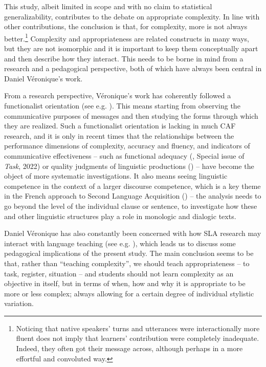 \documentclass[output=paper]{langscibook}
\begin{document}
This study, albeit limited in scope and with no claim to statistical generalizability, contributes to the debate on appropriate complexity. In line with other contributions, the conclusion is that, for complexity, more is not always better.\footnote{Noticing that native speakers’ turns and utterances were interactionally more fluent does not imply that learners’ contribution were completely inadequate. Indeed, they often got their message across, although perhaps in a more effortful and convoluted way.} Complexity and appropriateness are related constructs in many ways, but they are not isomorphic and it is important to keep them conceptually apart and then describe how they interact. This needs to be borne in mind from a research and a pedagogical perspective, both of which have always been central in Daniel Véronique’s work.

From a research perspective, Véronique’s work has coherently followed a functionalist orientation (see e.g. \citealt{Véronique1995acquisition,Véronique2013dislocation, Véronique2017c}). This means starting from observing the communicative purposes of messages and then studying the forms through which they are realized. Such a functionalist orientation is lacking in much CAF research, and it is only in recent times that the relationships between the performance dimensions of complexity, accuracy and fluency, and indicators of communicative effectiveness – such as functional adequacy (\citealt{Pallotti2009, deJongEtAl2012, KuikenVedder2022}, Special issue of \textit{Task}, 2022) or quality judgments of linguistic productions (\citealt{KyleCrossley2018, LahuertaMartínez2018, BiJiang2020}) – have become the object of more systematic investigations. It also means seeing linguistic competence in the context of a larger discourse competence, which is a key theme in the French approach to Second Language Acquisition (\citealt{LenartLeclercq2021}) -- the analysis needs to go beyond the level of the individual clause or sentence, to investigate how these and other linguistic structures play a role in monologic and dialogic texts.

Daniel Véronique has also constantly been concerned with how SLA research may interact with language teaching (see e.g. \citealt{Véronique2005Interrelations, Véronique2017Vers, LaurensVéronique2017}), which leads us to discuss some pedagogical implications of the present study. The main conclusion seems to be that, rather than “teaching complexity”, we should teach appropriateness – to task, register, situation – and students should not learn complexity as an objective in itself, but in terms of when, how and why it is appropriate to be more or less complex; always allowing for a certain degree of individual stylistic variation. 
\end{document}
